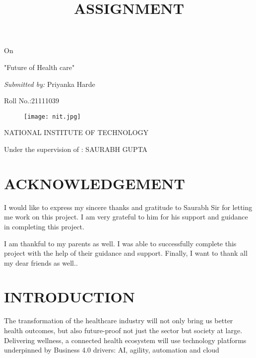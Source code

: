 \documentclass[11pt]{article}
\title{\Huge \textbf{ASSIGNMENT}}
\begin{document}
\maketitle
\centering On

\Huge "Future of Health care"
\setlength{\parskip}{0.5em}

\emph{\large Submitted by:}
\large Priyanka Harde

\large Roll No.:21111039
\begin{figure}[h]
\begin{center}
\texttt{[image: nit.jpg]}
\end{center}
\end{figure}

\textsc{\Large NATIONAL INSTITUTE OF TECHNOLOGY}

\large Under the supervision of : SAURABH GUPTA 
\clearpage 
\tableofcontents
\clearpage
\section{\huge  ACKNOWLEDGEMENT}
\Large \raggedright I would like to express my sincere thanks and gratitude to Saurabh Sir for letting me work on this project. I am very grateful to him for his support and guidance in completing this project.

I am thankful to my parents as well. I was able to successfully complete this project with the help of their guidance and support. Finally, I want to thank all my dear friends as well..

\section{\textbf{\huge INTRODUCTION}}
\raggedright The transformation of the healthcare industry will not only bring us better health outcomes, but also future-proof not just the sector but society at large. Delivering wellness, a connected health ecosystem will use technology platforms underpinned by Business 4.0 drivers: AI, agility, automation and cloud
\end{document}

